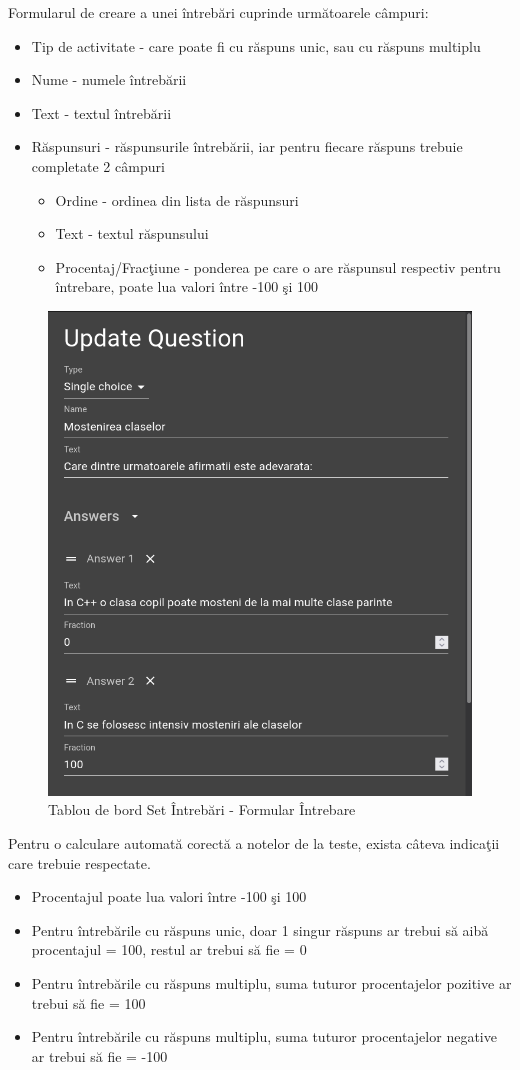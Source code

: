 \documentclass[12pt, a4paper, oneside, romanian]{teza-upb}
\begin{document}
Formularul de creare a unei întrebări cuprinde următoarele câmpuri:
\begin{itemize}
	\item Tip de activitate - care poate fi cu răspuns unic, sau cu răspuns multiplu
	\item Nume - numele întrebării
	\item Text - textul întrebării
	\item Răspunsuri - răspunsurile întrebării, iar pentru fiecare răspuns trebuie completate 2 câmpuri
		\begin{itemize}
			\item Ordine - ordinea din lista de răspunsuri
			\item Text - textul răspunsului
			\item Procentaj/Fracţiune - ponderea pe care o are răspunsul respectiv pentru întrebare, poate lua valori între -100 şi 100
		\end{itemize}
\end{itemize}

\begin{figure}[H]
\centering
\includegraphics*[width=0.7\columnwidth]{tablou-de-bord-set-intrebari-formular-intrebare}
\caption{Tablou de bord Set Întrebări - Formular Întrebare}
\label{tablou-de-bord-set-intrebari-formular-intrebare}
\end{figure}

Pentru o calculare automată corectă a notelor de la teste, exista câteva indicaţii care trebuie respectate.
\begin{itemize}
	\item Procentajul poate lua valori între -100 şi 100
	\item Pentru întrebările cu răspuns unic, doar 1 singur răspuns ar trebui să aibă procentajul = 100, restul ar trebui să fie = 0
	\item Pentru întrebările cu răspuns multiplu, suma tuturor procentajelor pozitive ar trebui să fie = 100
	\item Pentru întrebările cu răspuns multiplu, suma tuturor procentajelor negative ar trebui să fie = -100
\end{itemize}
\end{document}
